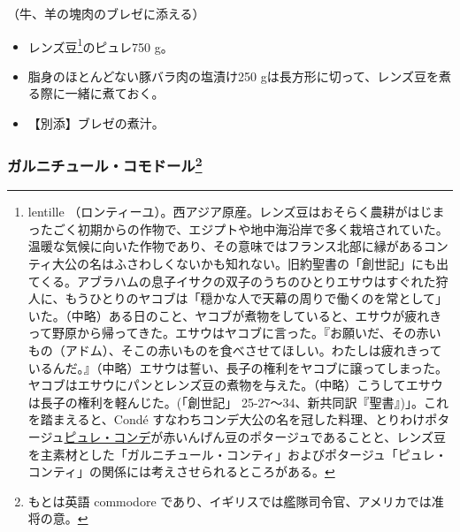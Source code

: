 \begin{recette}

（牛、羊の塊肉のブレゼに添える）

\begin{itemize}
\item
  レンズ豆\footnote{lentille
    （ロンティーユ）。西アジア原産。レンズ豆はおそらく農耕がはじまったごく初期からの作物で、エジプトや地中海沿岸で多く栽培されていた。温暖な気候に向いた作物であり、その意味ではフランス北部に縁があるコンティ大公の名はふさわしくないかも知れない。旧約聖書の「創世記」にも出てくる。アブラハムの息子イサクの双子のうちのひとりエサウはすぐれた狩人に、もうひとりのヤコブは「穏かな人で天幕の周りで働くのを常として」いた。（中略）ある日のこと、ヤコブが煮物をしていると、エサウが疲れきって野原から帰ってきた。エサウはヤコブに言った。『お願いだ、その赤いもの（アドム）、そこの赤いものを食べさせてほしい。わたしは疲れきっているんだ。』（中略）エサウは誓い、長子の権利をヤコブに譲ってしまった。ヤコブはエサウにパンとレンズ豆の煮物を与えた。（中略）こうしてエサウは長子の権利を軽んじた。(「創世記」
    25-27〜34、新共同訳『聖書』)」。これを踏まえると、Condé
    すなわちコンデ大公の名を冠した料理、とりわけポタージュ\protect\hyperlink{puree-conde}{ピュレ・コンデ}が赤いんげん豆のポタージュであることと、レンズ豆を主素材とした「ガルニチュール・コンティ」およびポタージュ「ピュレ・コンティ」の関係には考えさせられるところがある。}のピュレ750
  g。
\item
  脂身のほとんどない豚バラ肉の塩漬け250
  gは長方形に切って、レンズ豆を煮る際に一緒に煮ておく。
\item
  【別添】ブレゼの煮汁。
\end{itemize}

\atoaki{}

\hypertarget{garniture-commodore}{%
\subsubsection[ガルニチュール・コモドール]{\texorpdfstring{ガルニチュール・コモドール\footnote{もとは英語
  commodore であり、イギリスでは艦隊司令官、アメリカでは准将の意。}}{ガルニチュール・コモドール}}\label{garniture-commodore}}




\end{recette}
